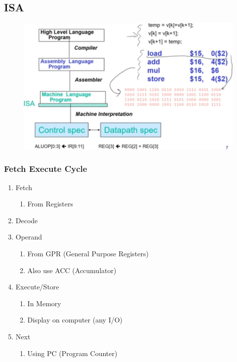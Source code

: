 \documentclass[11pt, a4paper]{article}
\begin{document}
\subsection{ISA}
\begin{figure}[H]
    \centering
    \includegraphics[width = \textwidth]{Module 5/Notes/ISA.png}
\end{figure}
\subsubsection{Fetch Execute Cycle}
\begin{enumerate}
    \item Fetch
    \begin{enumerate}
        \item From Registers
    \end{enumerate}
    \item Decode
    \item Operand
    \begin{enumerate}
        \item From GPR (General Purpose Registers)
        \item Also use ACC (Accumulator)
    \end{enumerate}
    \item Execute/Store
    \begin{enumerate}
        \item In Memory
        \item Display on computer (any I/O)
    \end{enumerate}
    \item Next
    \begin{enumerate}
        \item Using PC (Program Counter)
    \end{enumerate}
\end{enumerate}
\end{document}
